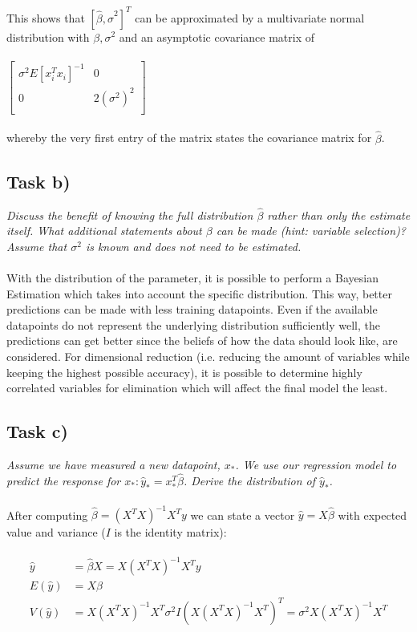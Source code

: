 \documentclass{article}
\begin{document}
This shows that $\left[\hat\beta, \hat\sigma^2\right]^T$ can be approximated by a multivariate normal distribution with $\beta, \sigma^2$ and an asymptotic covariance matrix of \\
\\
$
\begin{bmatrix}
\sigma^2E\left[x^T_ix_i\right]^{-1}	&  0				\\
0							& 2(\sigma^2)^2	\\
\end{bmatrix}
$
\\\\
whereby the very first entry of the matrix states the covariance matrix for $\hat\beta$.

\subsection*{Task b)}
\textit{Discuss the benefit of knowing the full distribution $\hat\beta$ rather than only the estimate itself. What additional statements about $\beta$ can be made (hint: variable selection)? Assume that $\sigma^2$ is known and does not need to be estimated.}\\
\\
With the distribution of the parameter, it is possible to perform a Bayesian Estimation which takes into account the specific distribution. This way, better predictions can be made with less training datapoints. Even if the available datapoints do not represent the underlying distribution sufficiently well, the predictions can get better since the beliefs of how the data should look like, are considered. For dimensional reduction (i.e. reducing the amount of variables while keeping the highest possible accuracy), it is possible to determine highly correlated variables for elimination which will affect the final model the least.

\subsection*{Task c)}
\textit{Assume we have measured a new datapoint, $x_*$. We use our regression model to predict the response for $x_*:\hat y_* = x_*^T\hat\beta$. Derive the distribution of $\hat y_*$.}\\
\\
After computing $\hat\beta = (X^TX)^{-1}X^Ty$ we can state a vector $\hat y = X\hat\beta$ with expected value and variance ($I$ is the identity matrix):

\begin{align}
\begin{aligned}
\hat y &= \hat\beta X = X (X^TX)^{-1}X^Ty\\
E(\hat y) &= X\beta\\
V(\hat y) &= X (X^TX)^{-1}X^T \sigma^2 I (X (X^TX)^{-1}X^T)^T = \sigma^2 X (X^TX)^{-1}X^T
\end{aligned}
\end{align}
\end{document}

